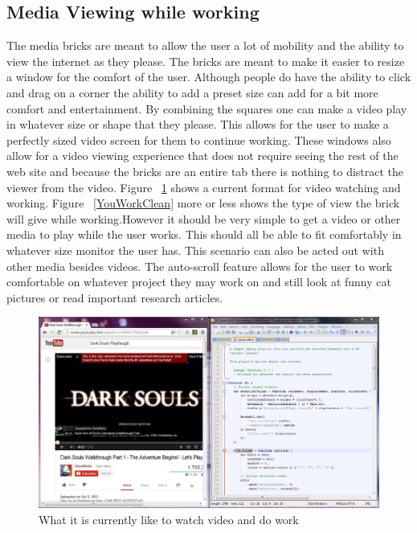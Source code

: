 \documentclass[11pt]{article}
\begin{document}
\subsection{Media Viewing while working}
The media bricks are meant to allow the user a lot of mobility and the ability to view the internet as they please. The bricks are meant to make it easier to resize a window for the comfort of the user. Although people do have the ability to click and drag on a corner the ability to add a preset size can add for a bit more comfort and entertainment. By combining the squares one can make a video play in whatever size or shape that they please. This allows for the user to make a perfectly sized video screen for them to continue working. These windows also allow for a video viewing experience that does not require seeing the rest of the web site and because the bricks are an entire tab there is nothing to distract the viewer from the video. Figure ~\ref{YouWork} shows a current format for video watching and working. Figure  ~\ref{YouWorkClean}  more or less shows the type of view the brick will give while working.However it should be very simple to get a video or other media to play while the user works. This should all be able to fit comfortably in whatever size monitor the user has. This scenario can also be acted out with other media besides videos. The auto-scroll feature allows for the user to work comfortable on whatever project they may work on and still look at funny cat pictures or read important research articles.
%

\begin{figure}[h!]
 \centering
    \includegraphics[width= 1\textwidth]{./Images/YoutubeWork}
  \caption{What it is currently like to watch video and do work}
 \label{YouWork}
\end{figure}
\end{document}
